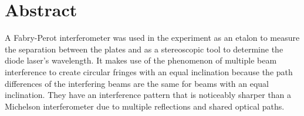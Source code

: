 \section{Abstract} 
	A Fabry-Perot interferometer was used in the experiment as an etalon to measure the separation between the plates and as a stereoscopic tool to determine the diode laser's wavelength. It makes use of the phenomenon of multiple beam interference to create circular fringes with an equal inclination because the path differences of the interfering beams are the same for beams with an equal inclination. They have an interference pattern that is noticeably sharper than a Michelson interferometer due to multiple reflections and shared optical paths.
